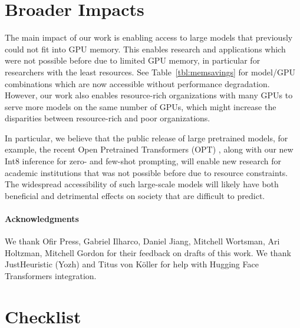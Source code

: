\documentclass{article}
\begin{document}
\section{Broader Impacts}
\vspace{-1em}

The main impact of our work is enabling access to large models that previously could not fit into GPU memory. This enables research and applications which were not possible before due to limited GPU memory, in particular for researchers with the least resources. See Table~\ref{tbl:memsavings} for model/GPU combinations which are now accessible without performance degradation.
However, our work also enables resource-rich organizations with many GPUs to serve more models on the same number of GPUs, which might increase the disparities between resource-rich and poor organizations.

In particular, we believe that the public release of large pretrained models, for example, the recent Open Pretrained Transformers (OPT) \citep{zhang2022opt}, along with our new Int8 inference for zero- and few-shot prompting, will enable new research for academic institutions that was not possible before due to resource constraints. The widespread accessibility of such large-scale models will likely have both beneficial and detrimental effects on society that are difficult to predict.

\paragraph{Acknowledgments}

We thank Ofir Press, Gabriel Ilharco, Daniel Jiang, Mitchell Wortsman, Ari Holtzman, Mitchell Gordon for their feedback on drafts of this work. We thank JustHeuristic (Yozh) and Titus von Köller for help with Hugging Face Transformers integration.



\section*{Checklist}
\end{document}
